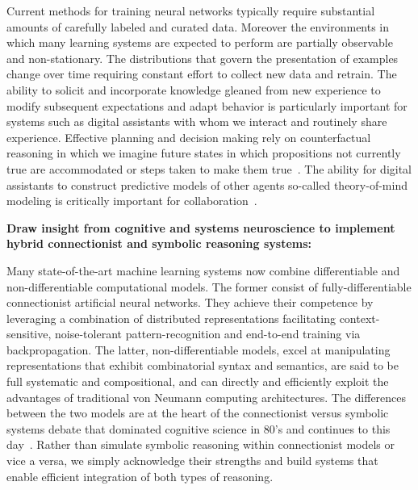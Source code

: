 Current methods for training neural networks typically require substantial amounts of carefully labeled and curated data. Moreover the environments in which many learning systems are expected to perform are partially observable and non-stationary. The distributions that govern the presentation of examples change over time requiring constant effort to collect new data and retrain. The ability to solicit and incorporate knowledge gleaned from new experience to modify subsequent expectations and adapt behavior is particularly important for systems such as digital assistants with whom we interact and routinely share experience. Effective planning and decision making rely on counterfactual reasoning in which we imagine future states in which propositions not currently true are accommodated or steps taken to make them true~\cite{HassabisandMaguireTiCS-07}. The ability for digital assistants to construct predictive models of other agents \emdash{} so-called theory-of-mind modeling \emdash{} is critically important for collaboration~\cite{RabinowitzetalCoRR-18}.


{\bf{Draw insight from cognitive and systems neuroscience to implement hybrid connectionist and symbolic reasoning systems:}}

Many state-of-the-art machine learning systems now combine differentiable and non-differentiable computational models. The former consist of fully-differentiable connectionist artificial neural networks. They achieve their competence by leveraging a combination of distributed representations facilitating context-sensitive, noise-tolerant pattern-recognition and end-to-end training via backpropagation. The latter, non-differentiable models, excel at manipulating representations that exhibit combinatorial syntax and semantics, are said to be full systematic and compositional, and can directly and efficiently exploit the advantages of traditional von Neumann computing architectures. The differences between the two models are at the heart of the connectionist versus symbolic systems debate that dominated cognitive science in 80's and continues to this day~\cite{OReillyetalTACO-14,FodorandPylyshynCOGNITION-88}. Rather than simulate symbolic reasoning within connectionist models or vice a versa, we simply acknowledge their strengths and build systems that enable efficient integration of both types of reasoning.


